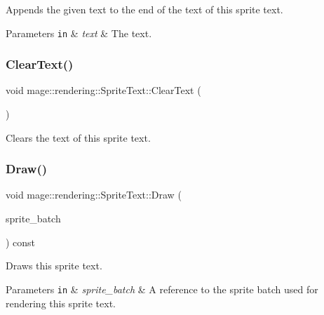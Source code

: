 Appends the given text to the end of the text of this sprite text.


\begin{DoxyParams}[1]{Parameters}
\mbox{\tt in}  & {\em text} & The text. \\
\hline
\end{DoxyParams}
\hypertarget{classmage_1_1rendering_1_1_sprite_text_a4458a9a429369d6cc0ed34eb93f3e632}{}\label{classmage_1_1rendering_1_1_sprite_text_a4458a9a429369d6cc0ed34eb93f3e632} 
\subsubsection{\texorpdfstring{Clear\+Text()}{ClearText()}}
{\footnotesize\ttfamily void mage\+::rendering\+::\+Sprite\+Text\+::\+Clear\+Text (\begin{DoxyParamCaption}{ }\end{DoxyParamCaption})\hspace{0.3cm}{\ttfamily [noexcept]}}

Clears the text of this sprite text. \hypertarget{classmage_1_1rendering_1_1_sprite_text_afbe374756e97dcec4fcf83f76a0c233b}{}\label{classmage_1_1rendering_1_1_sprite_text_afbe374756e97dcec4fcf83f76a0c233b} 
\subsubsection{\texorpdfstring{Draw()}{Draw()}}
{\footnotesize\ttfamily void mage\+::rendering\+::\+Sprite\+Text\+::\+Draw (\begin{DoxyParamCaption}\item[{\hyperlink{classmage_1_1rendering_1_1_sprite_batch}{Sprite\+Batch} \&}]{sprite\+\_\+batch }\end{DoxyParamCaption}) const}

Draws this sprite text.


\begin{DoxyParams}[1]{Parameters}
\mbox{\tt in}  & {\em sprite\+\_\+batch} & A reference to the sprite batch used for rendering this sprite text. \\
\hline
\end{DoxyParams}
\hypertarget{classmage_1_1rendering_1_1_sprite_text_a133345323aefa564460fd5cebe62cf78}{}\label{classmage_1_1rendering_1_1_sprite_text_a133345323aefa564460fd5cebe62cf78} 

